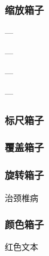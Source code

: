 \documentclass[twoside]{ctexart}
\begin{document}
        \subsubsection{缩放箱子}
        {\setlength{\fboxrule}{.1pt}
        \setlength{\fboxsep}{0pt}
            \fbox{\LaTeX}---\fbox{\scalebox{-1}[1]{\LaTeX}} 

            \fbox{\LaTeX}---\fbox{\scalebox{1}[-1]{\LaTeX}} 

            \fbox{\LaTeX}---\fbox{\scalebox{-1}{\LaTeX}} 

            \fbox{\LaTeX}---\fbox{\scalebox{2}[1]{\LaTeX}}

        }
        \subsubsection{标尺箱子}

        \subsubsection{覆盖箱子}

        \subsubsection{旋转箱子}
            治颈椎病

        \subsubsection{颜色箱子}
            {\color{red}红色文本}
            
\end{document}
